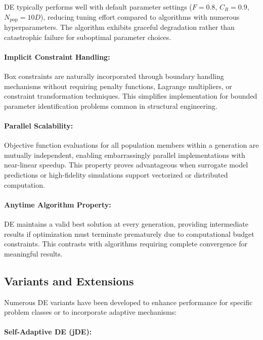 \documentclass[12pt,a4paper]{report}
\begin{document}
DE typically performs well with default parameter settings ($F = 0.8$, $C_R = 0.9$, $N_{\text{pop}} = 10D$), reducing tuning effort compared to algorithms with numerous hyperparameters. The algorithm exhibits graceful degradation rather than catastrophic failure for suboptimal parameter choices.

\paragraph{Implicit Constraint Handling:}

Box constraints are naturally incorporated through boundary handling mechanisms without requiring penalty functions, Lagrange multipliers, or constraint transformation techniques. This simplifies implementation for bounded parameter identification problems common in structural engineering.

\paragraph{Parallel Scalability:}

Objective function evaluations for all population members within a generation are mutually independent, enabling embarrassingly parallel implementations with near-linear speedup. This property proves advantageous when surrogate model predictions or high-fidelity simulations support vectorized or distributed computation.

\paragraph{Anytime Algorithm Property:}

DE maintains a valid best solution at every generation, providing intermediate results if optimization must terminate prematurely due to computational budget constraints. This contrasts with algorithms requiring complete convergence for meaningful results.



\subsection{Variants and Extensions}

Numerous DE variants have been developed to enhance performance for specific problem classes or to incorporate adaptive mechanisms:

\paragraph{Self-Adaptive DE (jDE):}
\end{document}
